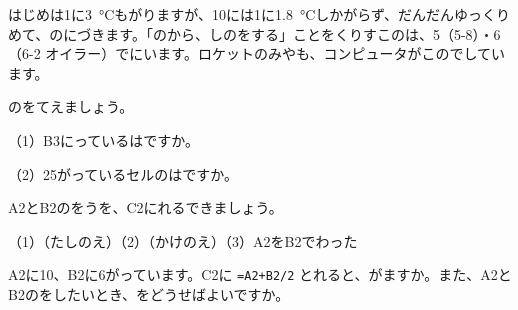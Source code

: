 \begin{butsuri}
\par\addvspace{4pt}
はじめは1に\qty{3}{\degreeCelsius}もがりますが、10には1に\qty{1.8}{\degreeCelsius}しかがらず、だんだんゆっくりめて、のにづきます。「のから、しのをする」ことをくりすこのは、5（5-8）・6（6-2 オイラー）でにいます。ロケットのみやも、コンピュータがこのでしています。
\end{butsuri}




\clearpage
\bkendproblems
{}

\bkproblem {}のをてえましょう。\par
\noindent\begin{minipage}[c]{0.5\linewidth}
（1）\nobreak B3にっているはですか。\par
（2）\nobreak 25がっているセルのはですか。
\end{minipage}\hfill
\begin{minipage}[c]{0.46\linewidth}\centering
{}
\end{minipage}

\bkproblem A2とB2のをうを、C2にれるできましょう。\par
（1）\nobreak {}（たしのえ）\quad（2）\nobreak {}（かけのえ）\quad（3）\nobreak A2をB2でわった

\bkproblem A2に10、B2に6がっています。C2に \texttt{=A2+B2/2} とれると、がますか。また、A2とB2のをしたいとき、をどうせばよいですか。

